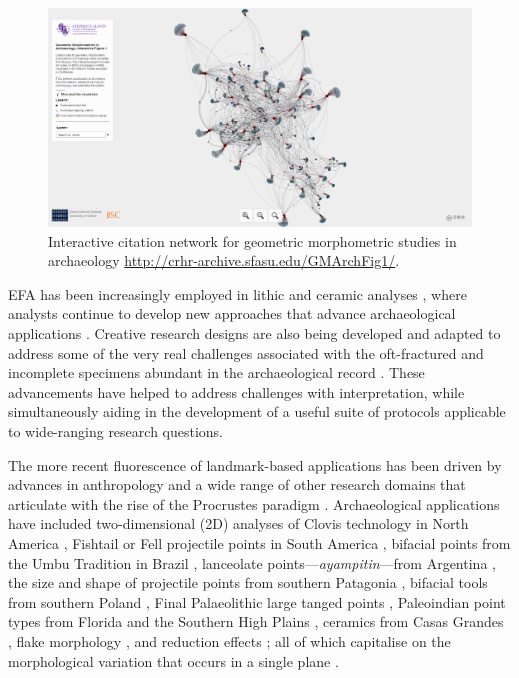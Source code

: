 \documentclass[review]{elsarticle}
\begin{document}
\begin{figure}[ht]\centering
\includegraphics[width=\linewidth]{net}
\caption{Interactive citation network for geometric morphometric studies in archaeology \href{http://crhr-archive.sfasu.edu/GMArchFig1/}{http://crhr-archive.sfasu.edu/GMArchFig1/}.}
\label{fig:network}
\end{figure}

EFA has been increasingly employed in lithic \citep{RN11556,RN4320x,RN11529,RN4350,RN4373,RN4338,RN4353,RN11521} and ceramic analyses  \citep{RN4335}, where analysts continue to develop new approaches that advance archaeological applications \citep{RN4143,RN253,RN11534}. Creative research designs are also being developed and adapted to address some of the very real challenges associated with the oft-fractured and incomplete specimens abundant in the archaeological record \citep{RN11575,RN11574,RN11539,RN11533,RN11730}. These advancements have helped to address challenges with interpretation, while simultaneously aiding in the development of a useful suite of protocols applicable to wide-ranging research questions. 

The more recent fluorescence of landmark-based applications has been driven by advances in anthropology \citep{RN11531,RN1770,RN306,RN1732} and a wide range of other research domains \citep{RN4453,RN1743,RN1762,RN4775,RN11553,RN11535,RN11526,RN11557,RN11554,RN1646,RN11541,RN478,RN11560} that articulate with the rise of the Procrustes paradigm \citep[8]{RN1743}. Archaeological applications have included two-dimensional (2D) analyses of Clovis technology in North America \citep{RN1754,RN1736,RN4378,RN11518,RN11519}, Fishtail or Fell projectile points in South America \citep{RN4346,RN11545}, bifacial points from the Umbu Tradition in Brazil \citep{RN11547,RN370,RN11548}, lanceolate points---\textit{ayampitin}---from Argentina \citep{RN11549}, the size and shape of projectile points from southern Patagonia \citep{RN4338x,RN4337x}, bifacial tools from southern Poland \citep{RN11551}, Final Palaeolithic large tanged points \citep{RN4738}, Paleoindian point types from Florida \citep{RN11528} and the Southern High Plains \citep{RN4358,RN11517}, ceramics from Casas Grandes \citep{RN11631}, flake morphology \citep{RN4334}, and reduction effects \citep{RN4349}; all of which capitalise on the morphological variation that occurs in a single plane \citep{RN1754,RN11542}. 
\end{document}
